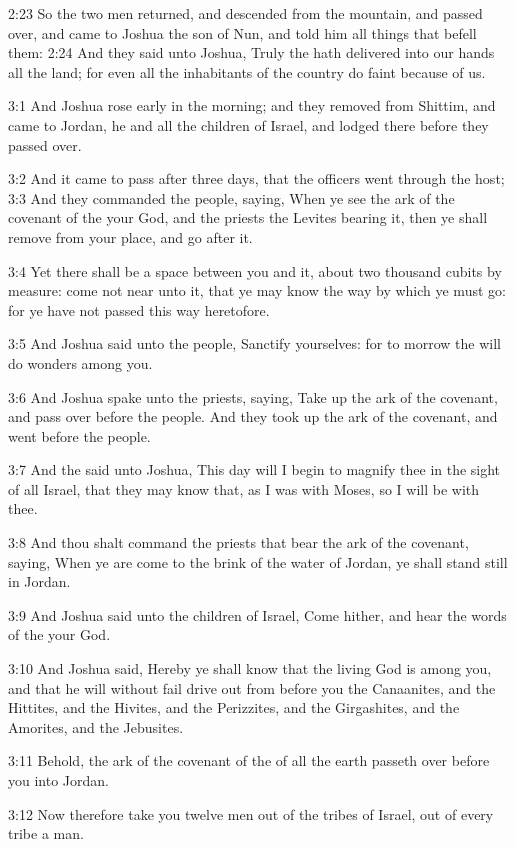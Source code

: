 2:23 So the two men returned, and descended from the mountain, and
passed over, and came to Joshua the son of Nun, and told him all
things that befell them: 2:24 And they said unto Joshua, Truly the
\LORD hath delivered into our hands all the land; for even all the
inhabitants of the country do faint because of us.

3:1 And Joshua rose early in the morning; and they removed from
Shittim, and came to Jordan, he and all the children of Israel, and
lodged there before they passed over.

3:2 And it came to pass after three days, that the officers went
through the host; 3:3 And they commanded the people, saying, When ye
see the ark of the covenant of the \LORD your God, and the priests the
Levites bearing it, then ye shall remove from your place, and go after
it.

3:4 Yet there shall be a space between you and it, about two thousand
cubits by measure: come not near unto it, that ye may know the way by
which ye must go: for ye have not passed this way heretofore.

3:5 And Joshua said unto the people, Sanctify yourselves: for to
morrow the \LORD will do wonders among you.

3:6 And Joshua spake unto the priests, saying, Take up the ark of the
covenant, and pass over before the people. And they took up the ark of
the covenant, and went before the people.

3:7 And the \LORD said unto Joshua, This day will I begin to magnify
thee in the sight of all Israel, that they may know that, as I was
with Moses, so I will be with thee.

3:8 And thou shalt command the priests that bear the ark of the
covenant, saying, When ye are come to the brink of the water of
Jordan, ye shall stand still in Jordan.

3:9 And Joshua said unto the children of Israel, Come hither, and hear
the words of the \LORD your God.

3:10 And Joshua said, Hereby ye shall know that the living God is
among you, and that he will without fail drive out from before you the
Canaanites, and the Hittites, and the Hivites, and the Perizzites, and
the Girgashites, and the Amorites, and the Jebusites.

3:11 Behold, the ark of the covenant of the \LORD of all the earth
passeth over before you into Jordan.

3:12 Now therefore take you twelve men out of the tribes of Israel,
out of every tribe a man.

